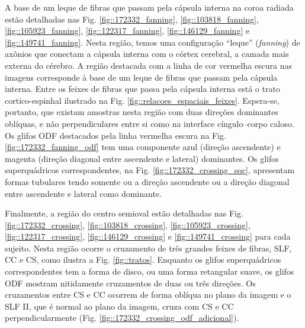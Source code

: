 A base de um leque de fibras que passam pela cápsula interna na coroa radiada estão detalhadas nas Fig.
\ref{fig::172332_fanning},
\ref{fig::103818_fanning},
\ref{fig::105923_fanning},
\ref{fig::122317_fanning},
\ref{fig::146129_fanning} e
\ref{fig::149741_fanning}. Nesta região, temos uma configuração ``leque'' (\textit{fanning}) de axônios que conectam a cápsula interna com o córtex cerebral, a camada mais externa do cérebro. A região destacada com a linha de cor vermelha escura nas imagens corresponde à base de um leque de fibras que passam pela cápsula interna.  Entre os feixes de fibras que passa pela cápsula interna está o trato cortico-espinhal ilustrado na Fig. \ref{fig::relacoes_espaciais_feixes}. Espera-se, portanto, que existam amostras nesta região com duas direções dominantes oblíquas, e não perpendiculares entre si como na interface cíngulo--corpo caloso. Os glifos ODF destacados pela linha vermelha escura na Fig. \ref{fig::172332_fanning_odf} tem uma componente azul (direção ascendente) e magenta (direção diagonal entre ascendente e lateral) dominantes. Os glifos superquádricos correspondentes, na Fig. \ref{fig::172332_crossing_sqc}, apresentam formas tubulares tendo somente ou a direção ascendente ou a direção diagonal entre ascendente e lateral como dominante.

Finalmente, a região do centro semioval estão detalhadas nas Fig.
\ref{fig::172332_crossing},
\ref{fig::103818_crossing},
\ref{fig::105923_crossing},
\ref{fig::122317_crossing},
\ref{fig::146129_crossing} e
\ref{fig::149741_crossing} para cada sujeito. Nesta região ocorre o cruzamento de três grandes feixes de fibras, SLF, CC e CS, como ilustra a Fig. \ref{fig::tratos}. Enquanto os glifos superquádricos correspondentes tem a forma de disco, ou uma forma retangular suave, os glifos ODF mostram nitidamente cruzamentos de duas ou três direções. Os cruzamentos entre CS e CC ocorrem de forma oblíqua no plano da imagem e o SLF II, que é normal ao plano da imagem, cruza com CS e CC perpendicularmente (Fig. \ref{fig::172332_crossing_odf_adicional}).





